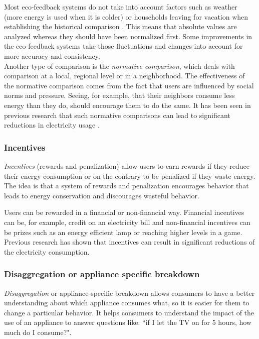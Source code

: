 \documentclass[journal]{vgtc}                %
\begin{document}
Most eco-feedback systems do not take into account factors such as weather (more energy is used when it is colder) or households leaving for vacation when establishing the historical comparison \cite{karjalainen2011consumer}. This means that absolute values are analyzed whereas they should have been normalized first. Some improvements in the eco-feedback systems take those fluctuations and changes into account for more accuracy and consistency. \\

Another type of comparison is the \textit{normative comparison}, which deals with comparison at a local, regional level or in a neighborhood. The effectiveness of the normative comparison comes from the fact that users are influenced by social norms and pressure. Seeing, for example, that their neighbors consume less energy than they do, should encourage them to do the same. It has been seen in previous research that such normative comparisons can lead to significant reductions in electricity usage \cite{peschiera2010response,siero1996changing,iyer2006comparison}.


\subsubsection{Incentives}
\textit{Incentives} (rewards and penalization) allow users to earn rewards if they reduce their energy consumption or on the contrary to be penalized if they waste energy. The idea is that a system of rewards and penalization encourages behavior that leads to energy conservation and discourages wasteful behavior.

Users can be rewarded in a financial or non-financial way. Financial incentives can be, for example, credit on an electricity bill and non-financial incentives can be prizes such as an energy efficient lamp or reaching higher levels in a game.
Previous research \cite{petersen2007dormitory} has shown that incentives can result in significant reductions of the electricity consumption.

\subsubsection{Disaggregation or appliance specific breakdown}
\textit{Disaggregation} or appliance-specific breakdown allows consumers to have a better understanding about which appliance consumes what, so it is easier for them to change a particular behavior. It helps consumers to understand the impact of the use of an appliance to answer questions like: ``if I let the TV on for 5 hours, how much do I consume?".
\end{document}
